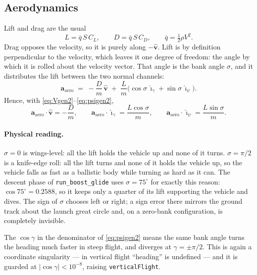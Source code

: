 \documentclass[11pt]{article}
\newcommand{\vhat}{\hat{\mathbf{v}}}
\newcommand{\ig}{\hat{\boldsymbol{\imath}}_{\gamma}}
\newcommand{\ip}{\hat{\boldsymbol{\imath}}_{\psi}}
\newcommand{\code}[1]{\texttt{#1}}
\begin{document}
\subsection{Aerodynamics}

Lift and drag are the usual
\begin{equation}
  L = \bar q\,S\,C_L , \qquad D = \bar q\,S\,C_D , \qquad
  \bar q = \tfrac12\rho V^2 .
  \label{eq:LD}
\end{equation}
Drag opposes the velocity, so it is purely along $-\vhat$. Lift is by
definition perpendicular to the velocity, which leaves it one degree of
freedom: the angle by which it is rolled about the velocity vector. That angle
is the bank angle $\sigma$, and it distributes the lift between the two normal
channels:
\begin{equation}
  \mathbf{a}_{\text{aero}} \;=\;
  -\frac{D}{m}\,\vhat \;+\; \frac{L}{m}\bigl(\cos\sigma\,\ig
  + \sin\sigma\,\ip\bigr) .
  \label{eq:aaero}
\end{equation}
Hence, with \eqref{eq:Vgen2}--\eqref{eq:psigen2},
\begin{equation}
  \mathbf{a}_{\text{aero}}\cdot\vhat = -\frac{D}{m}, \qquad
  \mathbf{a}_{\text{aero}}\cdot\ig   = \frac{L\cos\sigma}{m}, \qquad
  \mathbf{a}_{\text{aero}}\cdot\ip   = \frac{L\sin\sigma}{m} .
\end{equation}

\paragraph{Physical reading.}
$\sigma=0$ is wings-level: all the lift holds the vehicle up and none of it
turns. $\sigma=\pi/2$ is a knife-edge roll: all the lift turns and none of it
holds the vehicle up, so the vehicle falls as fast as a ballistic body while
turning as hard as it can. The descent phase of \code{run\_boost\_glide} uses
$\sigma=75^{\circ}$ for exactly this reason: $\cos 75^{\circ}=0.2588$, so it
keeps only a quarter of its lift supporting the vehicle and dives. The sign of
$\sigma$ chooses left or right; a sign error there mirrors the ground track
about the launch great circle and, on a zero-bank configuration, is completely
invisible.

The $\cos\gamma$ in the denominator of \eqref{eq:psigen2} means the same bank
angle turns the heading much faster in steep flight, and diverges at
$\gamma=\pm\pi/2$. This is again a coordinate singularity --- in vertical flight
``heading'' is undefined --- and it is guarded at $|\cos\gamma|<10^{-8}$,
raising \code{verticalFlight}.
\end{document}
